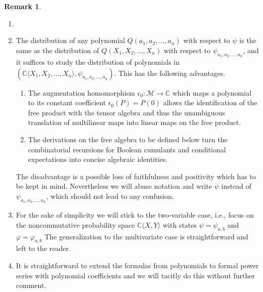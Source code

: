 \documentclass[12pt]{amsart}
\newcommand\IC{{\mathbb C}}
\newcommand{\alg}[1]{\mathcal{#1}}
\theoremstyle{definition}
\newtheorem{remark}[theorem]{Remark}
\numberwithin{equation}{section}
\begin{document}
\begin{remark}
  \begin{enumerate}[label=\arabic*., leftmargin=2em]
   \item []
   \item 
 The distribution of any polynomial $Q(a_1,a_2,\ldots,a_n)$ with respect to
  $\psi$ is the same as the distribution of $Q(X_1,X_2,\ldots,X_n)$ with respect to
  $\psi_{a_1,a_2,\dots,a_n}$,
  and it suffices to study the distribution of polynomials in
  $(\IC\langle X_1,X_2,\ldots,X_n\rangle,\psi_{a_1,a_2,\dots,a_n})$.
  This has the following advantages.
  \begin{enumerate}[label=(\roman*), leftmargin=2em]
   \item   The augmentation homomorphism  $\epsilon_0:\mathcal{M}\to\mathbb{C}$
    which maps a polynomial to its constant coefficient $\epsilon_0(P)=P(0)$
    allows the identification of the free product with the tensor algebra
    and thus the unambiguous translation of multilinear maps into
    linear maps on the free product.
   \item
    The derivations on the free algebra to be defined below
    turn the combinatorial recursions for Boolean cumulants and conditional expectations
    into concise algebraic identities.
  \end{enumerate}
  The disadvantage is a possible loss of faithfulness and positivity which has
  to be kept in mind.
  Nevertheless we will abuse notation and write $\psi$ instead of
  $\psi_{a_1,a_2,\dots,a_n}$, which should not lead to any confusion.

 \item
   For the sake of simplicity we will stick to the two-variable case,
  i.e., focus on the noncommutative probability space $\mathbb{C}\langle
  X,Y\rangle
  $ with states $\psi=\psi_{a,b}$ and $\varphi=\varphi_{a,b}$
  The generalization to the multivariate case is straightforward and left to 
  the reader.

  
 \item
  It is straightforward to extend the formulas from polynomials
  to formal power series with polynomial coefficients and
  we will tacitly do this without further comment.
  \end{enumerate}
  
\end{remark}
\end{document}
